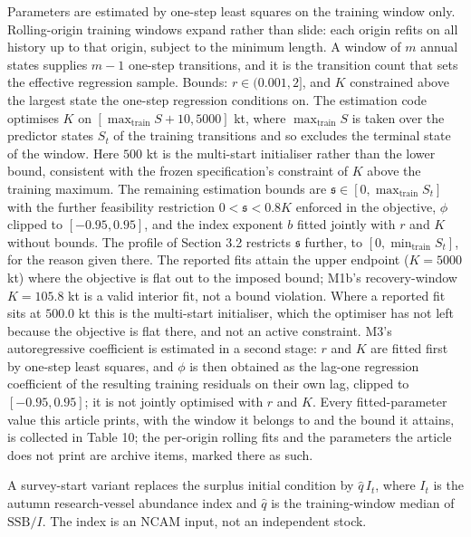 \documentclass[11pt]{article}
\begin{document}
Parameters are estimated by one-step least squares on the training
window only. Rolling-origin training windows expand rather than slide:
each origin refits on all history up to that origin, subject to the
minimum length. A window of \(m\) annual states supplies
\(m-1\) one-step transitions, and it is the transition count that sets
the effective regression sample. Bounds: \(r\in(0.001,2]\), and \(K\) constrained above the largest state
the one-step regression conditions on. The estimation code optimises
\(K\) on \([\max_{\mathrm{train}} S + 10, 5000]\) kt, where
\(\max_{\mathrm{train}} S\) is taken over the predictor states \(S_t\)
of the training transitions and so excludes the terminal state of the
window. Here \(500\) kt is the multi-start initialiser rather than the
lower bound, consistent with the frozen specification's constraint of
\(K\) above the training maximum.
The remaining estimation bounds are
\(\mathfrak s \in [0, \max_{\mathrm{train}} S_t]\) with the further
feasibility restriction \(0 < \mathfrak s < 0.8K\) enforced in the
objective, \(\phi\) clipped to \([-0.95, 0.95]\), and the index
exponent \(b\) fitted jointly with \(r\) and \(K\) without bounds.
The profile of Section 3.2 restricts \(\mathfrak s\) further, to
\([0, \min_{\mathrm{train}} S_t]\), for the reason given there. The
reported fits attain the upper endpoint (\(K = 5000\) kt) where the
objective is flat out to the imposed bound; M1b's recovery-window
\(K = 105.8\) kt is a valid interior fit, not a bound violation. Where a
reported fit sits at \(500.0\) kt this is the multi-start initialiser,
which the optimiser has not left because the objective is flat there,
and not an active constraint. M3's autoregressive coefficient is
estimated in a second stage: \(r\) and \(K\) are fitted first by
one-step least squares, and \(\phi\) is then obtained as the
lag-one regression coefficient of the resulting training residuals on
their own lag, clipped to \([-0.95, 0.95]\); it is not jointly
optimised with \(r\) and \(K\). Every
fitted-parameter value this article prints, with the window it belongs
to and the bound it attains, is collected in Table 10; the per-origin
rolling fits and the parameters the article does not print are archive
items, marked there as such.

A survey-start variant replaces the surplus initial condition by
\(\hat q\,I_t\), where \(I_t\) is the autumn research-vessel abundance
index and \(\hat q\) is the training-window median of
\(\mathrm{SSB}/I\). The index is an NCAM input, not an independent
stock.
\end{document}

